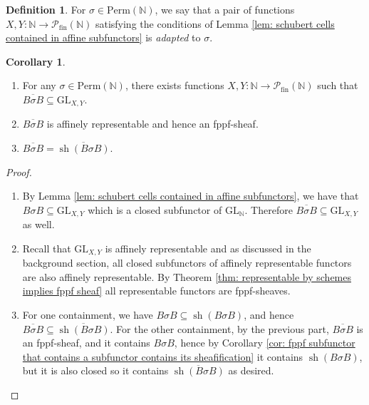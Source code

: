 \documentclass[oneside,11pt]{amsart}
\newcommand{\nn}{\ensuremath{\mathbb{N}}}
\newcommand{\mP}{\ensuremath{\mathcal{P}}}
\newcommand{\GL}{\ensuremath{\text{GL}}}
\newcommand{\Perm}{\ensuremath{\text{Perm}}}
\newcommand{\sh}{\operatorname{sh}}
\theoremstyle{definition}
\newtheorem{definition}{Definition}
\newtheorem{proof techniques}{Proof Techniques}
\newtheorem{corollary}{Corollary}
\begin{document}

\begin{definition}
For $\sigma \in \Perm(\nn)$, we say that a pair of functions $X , Y : \nn \to \mP_{\text{fin}}(\nn)$ satisfying the conditions of Lemma \ref{lem: schubert cells contained in affine subfunctors} is \emph{adapted} to $\sigma$. 
\end{definition}


\begin{corollary}
\
\begin{enumerate}

\item For any $\sigma \in \Perm(\nn)$, there exists functions $X , Y : \nn \to \mP_{\text{fin}}(\nn)$ such that $\overline{B \sigma B} \subseteq \GL_{X , Y}$. 

\item $\overline{B \sigma B}$ is affinely representable and hence an fppf-sheaf. 

\item $\overline{B \sigma B} = \overline{\sh( B \sigma B )}$.

\end{enumerate}
\end{corollary}

\begin{proof}
\
\begin{enumerate}

\item By Lemma \ref{lem: schubert cells contained in affine subfunctors}, we have that $B \sigma B \subseteq \GL_{X , Y}$ which is a closed subfunctor of $\GL_\nn$. Therefore $\overline{B \sigma B} \subseteq \GL_{X , Y}$ as well. 

\item Recall that $\GL_{X , Y}$ is affinely representable and as discussed in the background section, all closed subfunctors of affinely representable functors are also affinely representable. By Theorem \ref{thm: representable by schemes implies fppf sheaf} all representable functors are fppf-sheaves.

\item For one containment, we have $B \sigma B \subseteq \sh(B \sigma B)$, and hence $\overline{B \sigma B} \subseteq \overline{\sh( B \sigma B)}$. For the other containment, by the previous part, $\overline{B \sigma B}$ is an fppf-sheaf, and it contains $B \sigma B$, hence by Corollary \ref{cor: fppf subfunctor that contains a subfunctor contains its sheafification} it contains $\sh(B \sigma B)$, but it is also closed so it contains $\overline{\sh( B \sigma B )}$ as desired. 

\end{enumerate}
\end{proof}
\end{document}
